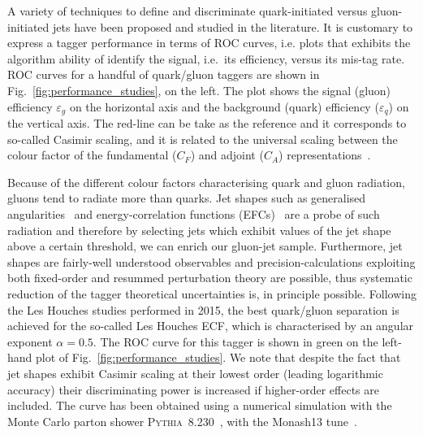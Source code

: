 A variety of techniques to define and discriminate quark-initiated versus gluon-initiated jets have been proposed and studied in the literature. It is customary to express a tagger performance in terms of ROC curves, i.e. plots that exhibits the algorithm ability of identify the signal, i.e.\ its efficiency, versus its mis-tag rate. ROC curves for a handful of quark/gluon taggers are shown in Fig.~\ref{fig:performance_studies}, on the left.
%
The plot shows the signal (gluon) efficiency $\varepsilon_g$ on the horizontal axis and the background (quark) efficiency ($\varepsilon_q$) on the vertical axis. The red-line can be take as the reference and it corresponds to so-called Casimir scaling, and it is related to the universal scaling between the colour factor of the fundamental ($C_F$) and adjoint ($C_A$) representations~\cite{Larkoski:2014pca}. 

Because of the different colour factors characterising quark and gluon radiation, gluons tend to radiate more than quarks. Jet shapes such as generalised angularities~\cite{Larkoski:2014pca} and energy-correlation functions (EFCs)~\cite{Larkoski:2013eya} are a probe of such radiation and therefore by selecting jets which exhibit values of the jet shape above a certain threshold, we can enrich our gluon-jet sample. 
% 
Furthermore, jet shapes are fairly-well understood observables and precision-calculations exploiting both fixed-order and resummed perturbation theory are possible, thus systematic reduction of the tagger theoretical uncertainties is, in principle possible. Following the Les Houches studies performed in 2015, the best quark/gluon separation is achieved for the so-called Les Houches ECF, which is characterised by an angular exponent $\alpha=0.5$.
%
The ROC curve for this tagger is shown in green on the left-hand plot of  Fig.~\ref{fig:performance_studies}. We note that despite the fact that jet shapes exhibit Casimir scaling at their lowest order (leading logarithmic accuracy) their discriminating power is increased if higher-order effects are included.
%
The curve has been obtained using a numerical simulation with the Monte Carlo parton shower \textsc{Pythia}~8.230~\cite{Sjostrand:2014zea}, with the Monash13 tune~\cite{Skands:2014pea}.


